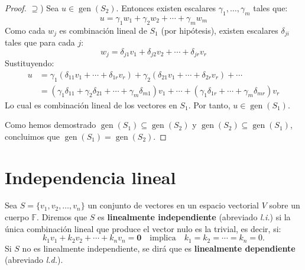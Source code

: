 \begin{proof}
$\supseteq$) Sea $u \in \operatorname{gen}(S_2)$. Entonces existen escalares $\gamma_1, \dots, \gamma_m$ tales que:
\[u = \gamma_1 w_1 + \gamma_2 w_2 + \cdots + \gamma_m w_m\]
Como cada $w_j$ es combinación lineal de $S_1$ (por hipótesis), existen escalares $\delta_{ji}$ tales que para cada $j$:
\[w_j = \delta_{j1} v_1 + \delta_{j2} v_2 + \cdots + \delta_{jr} v_r\]
Sustituyendo:
\begin{align*}
u &= \gamma_1 (\delta_{11} v_1 + \cdots + \delta_{1r} v_r) + \gamma_2 (\delta_{21} v_1 + \cdots + \delta_{2r} v_r) + \cdots \\
&= (\gamma_1 \delta_{11} + \gamma_2 \delta_{21} + \cdots + \gamma_m \delta_{m1}) v_1 + \cdots + (\gamma_1 \delta_{1r} + \cdots + \gamma_m \delta_{mr}) v_r
\end{align*}
Lo cual es combinación lineal de los vectores en $S_1$. Por tanto, $u \in \operatorname{gen}(S_1)$.

Como hemos demostrado $\operatorname{gen}(S_1) \subseteq \operatorname{gen}(S_2)$ y $\operatorname{gen}(S_2) \subseteq \operatorname{gen}(S_1)$, concluimos que $\operatorname{gen}(S_1) = \operatorname{gen}(S_2)$.
\end{proof}

\section{Independencia lineal}

\begin{definition} 
Sea $S = \{v_1, v_2, \dots, v_n\}$ un conjunto de vectores en un espacio vectorial $V$ sobre un cuerpo $\mathbb{F}$. Diremos que $S$ es \textbf{linealmente independiente} (abreviado \textit{l.i.}) si la única combinación lineal que produce el vector nulo es la trivial, es decir, si:
$$k_1v_1 + k_2v_2 + \cdots + k_nv_n = \mathbf{0} \quad \text{implica} \quad k_1 = k_2 = \cdots = k_n = 0.$$
Si $S$ no es linealmente independiente, se dirá que es \textbf{linealmente dependiente} (abreviado \textit{l.d.}).
\end{definition}

